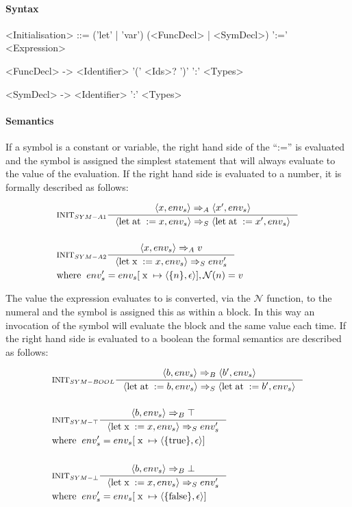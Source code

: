 \paragraph{Syntax}

\begin{grammar}
<Initialisation> ::= ('let' | 'var') (<FuncDecl> | <SymDecl>) ':=' <Expression>

<FuncDecl> -> <Identifier> '(' <Ids>? ')' ':' <Types>

<SymDecl> -> <Identifier> ':' <Types>
\end{grammar}

\paragraph{Semantics}

If a symbol is a constant or variable, the right hand side of the \enquote{:=} is evaluated and the symbol is assigned the simplest statement that will always evaluate to the value of the evaluation. If the right hand side is evaluated to a number, it is formally described as follows:

\begin{align*}
&\inference[$\text{INIT}_{SYM-A1}$]{\Braket{x,env_s} \Rightarrow_A \Braket{x',env_s}}
                         {\Braket{\Tlet \Tat := x,env_s} \Rightarrow_S \Braket{\Tlet \Tat := x',env_s}}
\\\\
&\inference[$\text{INIT}_{SYM-A2}$]{\Braket{x,env_s} \Rightarrow_A v}
                         {\Braket{\Tlet \Tx := x,env_s} \Rightarrow_S env_s'}
\\
&{\Twhere env_s' = env_{s}[\Tx \mapsto \Braket{\{n\},\epsilon}], \mathcal{N}(n) = v}
\end{align*}

The value the expression evaluates to is converted, via the $\mathcal{N}$ function, to the numeral and the symbol is assigned this as within a block. In this way an invocation of the symbol will evaluate the block and the same value each time. If the right hand side is evaluated to a boolean the formal semantics are described as follows:

\begin{align*}
&\inference[$\text{INIT}_{SYM-BOOL}$]{\Braket{b,env_s} \Rightarrow_B \Braket{b',env_s}}
                         {\Braket{\Tlet \Tat := b,env_s} \Rightarrow_S \Braket{\Tlet \Tat := b',env_s}}
\\\\
&\inference[$\text{INIT}_{SYM-\top}$]{\Braket{b,env_s} \Rightarrow_B \top}
                         {\Braket{\Tlet \Tx := x,env_s} \Rightarrow_S env_s'}
\\
&{\Twhere env_s' = env_{s}[\Tx \mapsto \Braket{\{\Ttrue\},\epsilon}]}
\\\\
&\inference[$\text{INIT}_{SYM-\bot}$]{\Braket{b,env_s} \Rightarrow_B \bot}
                         {\Braket{\Tlet \Tx := x,env_s} \Rightarrow_S env_s'}
\\
&{\Twhere env_s' = env_{s}[\Tx \mapsto \Braket{\{\Tfalse\},\epsilon}]}
\end{align*}


